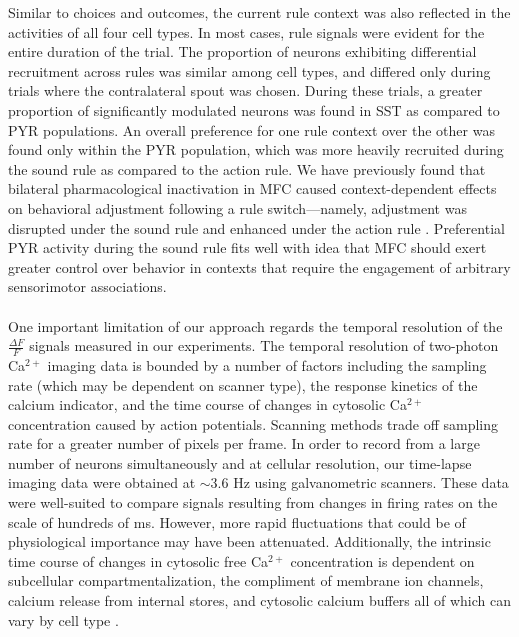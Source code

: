 Similar to choices and outcomes, the current rule context was also reflected in the activities of all four cell types. In most cases, rule signals were evident for the entire duration of the trial. The proportion of neurons exhibiting differential recruitment across rules was similar among cell types, and differed only during trials where the contralateral spout was chosen. During these trials, a greater proportion of significantly modulated neurons was found in SST as compared to PYR populations. An overall preference for one rule context over the other was found only within the PYR population, which was more heavily recruited during the sound rule as compared to the action rule. We have previously found that bilateral pharmacological inactivation in MFC caused context-dependent effects on behavioral adjustment following a rule switch---namely, adjustment was disrupted under the sound rule and enhanced under the action rule \citep{siniscalchi2016fast}. Preferential PYR activity during the sound rule fits well with idea that MFC should exert greater control over behavior in contexts that require the engagement of arbitrary sensorimotor associations. 

\paragraph{}One important limitation of our approach regards the temporal resolution of the $\frac{\Delta F}{F}$ signals measured in our experiments. The temporal resolution of two-photon Ca$^{2+}$ imaging data is bounded by a number of factors including the sampling rate (which may be dependent on scanner type), the response kinetics of the calcium indicator, and the time course of changes in cytosolic Ca$^{2+}$ concentration caused by action potentials. Scanning methods trade off sampling rate for a greater number of pixels per frame. In order to record from a large number of neurons simultaneously and at cellular resolution, our time-lapse imaging data were obtained at $\sim3.6$ Hz using galvanometric scanners. These data were well-suited to compare signals resulting from changes in firing rates on the scale of hundreds of ms. However, more rapid fluctuations that could be of physiological importance may have been attenuated. Additionally, the intrinsic time course of changes in cytosolic free Ca$^{2+}$ concentration is dependent on subcellular compartmentalization, the compliment of membrane ion channels, calcium release from internal stores, and cytosolic calcium buffers \citep{higley2008calcium,higley2012calcium} all of which can vary by cell type \citep{lee2000differences}.

